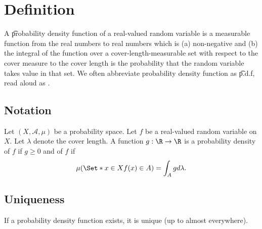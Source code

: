 

\section*{Definition}

A \t{probability density function} of a real-valued random variable is a measurable function from the real numbers to real numbers which is (a) non-negative and (b) the integral of the function over a cover-length-measurable set with respect to the cover measure to the cover length is the probability that the random variable takes value in that set.
We often abbreviate probability density function as \t{p.d.f}, read aloud as .

\subsection*{Notation}

Let $(X, \mathcal{A} , \mu )$ be a probability space.
Let $f$ be a real-valued random variable on $X$.
Let $\lambda $ denote the cover length.
A function $g: \R  \to \R $ is a probability density of $f$ if $g \geq 0$ and of $f$ if
    \[
\mu (\Set*{x \in X}{f(x) \in A}) = \int _{A} g d\lambda .
    \]

\subsection*{Uniqueness}

\begin{proposition}
If a probability density function exists, it is unique (up to almost everywhere).\end{proposition}
\blankpage